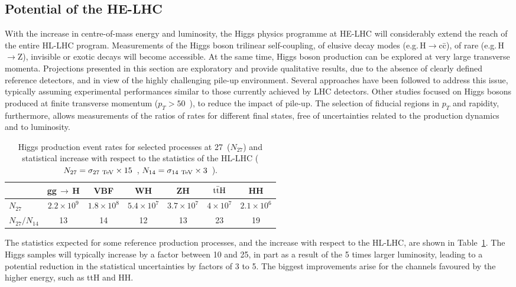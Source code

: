 \documentclass[../report.tex]{subfiles}
\begin{document}
\subsection{Potential of the HE-LHC}
With the increase in centre-of-mass energy and luminosity, the Higgs physics programme at HE-LHC will considerably extend the reach of the entire HL-LHC program. Measurements of the Higgs boson trilinear self-coupling, of elusive decay modes (e.g.\,H$\to$c\={c}), of rare (e.g.\,H$\to$Z\textgamma), invisible or exotic decays will become accessible. At the same time, Higgs boson production can be explored at very large transverse momenta.
Projections presented in this section are exploratory and provide qualitative results, due to the absence of clearly defined reference detectors, and in view of the highly challenging pile-up environment. Several approaches have been followed to address this issue, typically assuming experimental performances similar to those currently achieved by LHC detectors. Other studies focused on Higgs bosons produced at finite transverse momentum ($p_T>50$~\UGeV), to reduce the impact of pile-up. The selection of fiducial regions in $p_T$ and rapidity, furthermore, allows measurements of the ratios of rates for different final states, free of uncertainties related to the production dynamics and to luminosity. 

\begin{table}[h]
\centering
  \caption{\label{tab:Hrates}
Higgs production event rates for selected processes
    at 27~\UTeV ($N_{27}$) and
 statistical increase with 
 respect to the statistics of the HL-LHC ($N_{27}=\sigma_{27~\mathrm{\text{TeV}}} \times 15$~\iab, 
 $N_{14}=\sigma_{14~\mathrm{\text{TeV}}} \times 3$~\iab).} 
\begin{tabular}{|l|c|c|c|c|c|c|} 
\hline  \hline
&  gg\,$\to$\,H   & VBF &
 WH  &
 ZH  &
 $\rm t\bar{t}H$ &
 HH 
 \\ \hline
$N_{27}$  & $2.2\times 10^9$ & $1.8\times 10^8$ & $5.4\times 10^7$ & $3.7\times
 10^7$ &  $4\times 10^7$ & $2.1 \times 10^6$  \\
$N_{27}/N_{14}$ & 13 & 14 & 12 & 13 &23 & 19
\\ \hline
\hline
\end{tabular}
\end{table}
The statistics expected for some reference production processes, and the increase with respect to the HL-LHC, are shown in
Table~\ref{tab:Hrates}. The Higgs samples will typically increase by a factor between 10 and 25, in part as a result of the 5 times larger luminosity, leading to a potential reduction in the statistical uncertainties by factors of 3 to 5. The biggest improvements arise for the channels favoured by the higher energy, such as ttH and HH.
\end{document}
